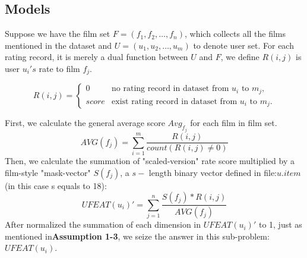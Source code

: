 \subsection{Models}
Suppose we have the film set $F=(f_{1},f_{2},\ldots,f_{n})$, which collects all the films mentioned in the dataset and $U=(u_{1},u_{2},\ldots,u_{m})$ to denote user set. For each rating record, it is merely a dual function between $U$ and $F$, we define $R(i,j)$ is user $u_{i}'s$ rate to film $f_{j}$. 

\begin{equation}
R(i,j)=\begin{cases}
0&\text{no rating record in dataset from $u_{i}$ to $m_{j}$},\\
score&
\text{exist rating record in dataset from $u_{i}$ to $m_{j}$}.
\end{cases}
\end{equation}

First, we calculate the general average score $Avg_{f_{j}}$ for each film in film set. 
\begin{equation}
AVG(f_{j})=\sum^{m}_{i=1}\dfrac{R(i,j)}{count(R(i,j)\neq0)}
\end{equation}
Then, we calculate the summation of "scaled-version" rate score multiplied  by a film-style "mask-vector" $S(f_{j})$, a $s-$ length binary vector defined in file:$u.item$(in this case s equals to 18):
\begin{equation}
UFEAT(u_{i})'=\sum^{n}_{j=1}\dfrac{S(f_{j})*R(i,j)}{AVG(f_{j})}
\end{equation}
After normalized the summation of each dimension in $UFEAT(u_{i})'$ to 1, just as mentioned in\textbf{Assumption 1-3}, we seize the answer in this sub-problem: $UFEAT(u_{i})$. 

